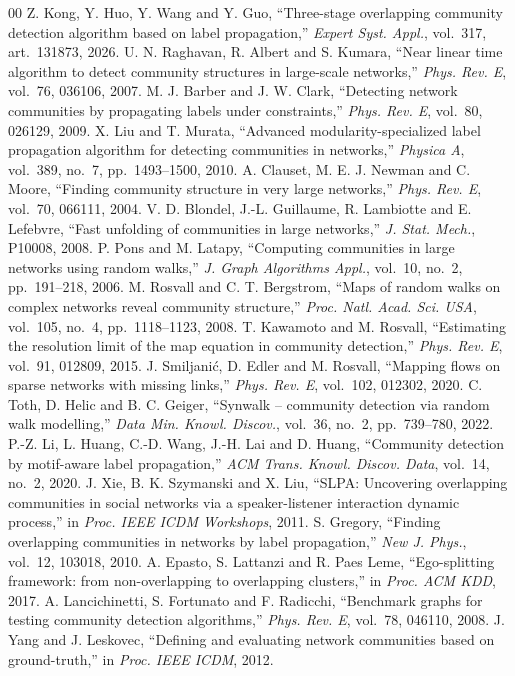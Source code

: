 \documentclass[conference]{IEEEtran}
\begin{document}
\begin{thebibliography}{00}
 Z. Kong, Y. Huo, Y. Wang and Y. Guo, ``Three-stage overlapping community detection algorithm based on label propagation,'' \emph{Expert Syst. Appl.}, vol.~317, art.~131873, 2026.
 U. N. Raghavan, R. Albert and S. Kumara, ``Near linear time algorithm to detect community structures in large-scale networks,'' \emph{Phys. Rev. E}, vol.~76, 036106, 2007.
 M. J. Barber and J. W. Clark, ``Detecting network communities by propagating labels under constraints,'' \emph{Phys. Rev. E}, vol.~80, 026129, 2009.
 X. Liu and T. Murata, ``Advanced modularity-specialized label propagation algorithm for detecting communities in networks,'' \emph{Physica A}, vol.~389, no.~7, pp.~1493--1500, 2010.
 A. Clauset, M. E. J. Newman and C. Moore, ``Finding community structure in very large networks,'' \emph{Phys. Rev. E}, vol.~70, 066111, 2004.
 V. D. Blondel, J.-L. Guillaume, R. Lambiotte and E. Lefebvre, ``Fast unfolding of communities in large networks,'' \emph{J. Stat. Mech.}, P10008, 2008.
 P. Pons and M. Latapy, ``Computing communities in large networks using random walks,'' \emph{J. Graph Algorithms Appl.}, vol.~10, no.~2, pp.~191--218, 2006.
 M. Rosvall and C. T. Bergstrom, ``Maps of random walks on complex networks reveal community structure,'' \emph{Proc. Natl. Acad. Sci. USA}, vol.~105, no.~4, pp.~1118--1123, 2008.
 T. Kawamoto and M. Rosvall, ``Estimating the resolution limit of the map equation in community detection,'' \emph{Phys. Rev. E}, vol.~91, 012809, 2015.
 J. Smiljani\'c, D. Edler and M. Rosvall, ``Mapping flows on sparse networks with missing links,'' \emph{Phys. Rev. E}, vol.~102, 012302, 2020.
 C. Toth, D. Helic and B. C. Geiger, ``Synwalk -- community detection via random walk modelling,'' \emph{Data Min. Knowl. Discov.}, vol.~36, no.~2, pp.~739--780, 2022.
 P.-Z. Li, L. Huang, C.-D. Wang, J.-H. Lai and D. Huang, ``Community detection by motif-aware label propagation,'' \emph{ACM Trans. Knowl. Discov. Data}, vol.~14, no.~2, 2020.
 J. Xie, B. K. Szymanski and X. Liu, ``SLPA: Uncovering overlapping communities in social networks via a speaker-listener interaction dynamic process,'' in \emph{Proc. IEEE ICDM Workshops}, 2011.
 S. Gregory, ``Finding overlapping communities in networks by label propagation,'' \emph{New J. Phys.}, vol.~12, 103018, 2010.
 A. Epasto, S. Lattanzi and R. Paes Leme, ``Ego-splitting framework: from non-overlapping to overlapping clusters,'' in \emph{Proc. ACM KDD}, 2017.
 A. Lancichinetti, S. Fortunato and F. Radicchi, ``Benchmark graphs for testing community detection algorithms,'' \emph{Phys. Rev. E}, vol.~78, 046110, 2008.
 J. Yang and J. Leskovec, ``Defining and evaluating network communities based on ground-truth,'' in \emph{Proc. IEEE ICDM}, 2012.
\end{thebibliography}
\end{document}
